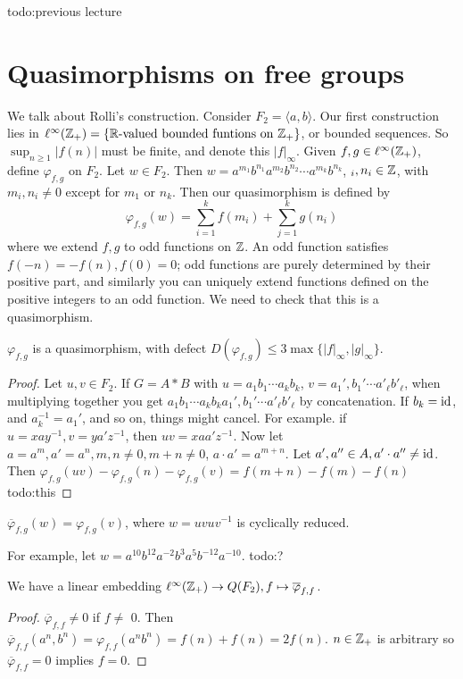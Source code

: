 {\color{red}todo:previous lecture} 
\section{Quasimorphisms on free groups} 
We talk about Rolli's construction. Consider $F_2=\langle a,b \rangle $. Our first construction lies in $\ell ^{\infty}(\Z_+)= \{\R\text{-valued bounded funtions on} \ \Z_+\} $, or bounded sequences. So $\sup _{n\geq 1}|f(n)|$ must be finite, and denote this $|f|_{\infty}$. Given $f,g \in \ell ^{\infty}(\mathbb{Z}_+)$, define $\varphi  _{f,g}$ on $F_2$. Let $w \in F_2$. Then $w=a ^{m_1}b^{n_1}a ^{m_2}b^{n_2}\cdots a ^{m_k}b ^{n_k}$, $_i ,n_i  \in \mathbb{Z}$, with $m_i ,n _i  \neq 0$ except for $m_1$ or $n_k$. Then our quasimorphism is defined by \[ \varphi _{f,g}(w)=\sum _{i=1}^k f(m_i )+ \sum _{j=1}^k g(n_i )
\] where we extend $f,g$ to odd functions on $\mathbb{Z}$. An odd function satisfies $f(-n)=-f(n), f(0)=0$; odd functions are purely determined by their positive part, and similarly you can uniquely extend functions defined on the positive integers to an odd function. We need to check that this is a quasimorphism.
\begin{lemma}
    $\varphi _{f,g}$ is a quasimorphism, with defect $D(\varphi _{f,g}) \leq 3 \max \{|f|_{\infty}, |g|_{\infty}\} $.
\end{lemma}
\begin{proof}
    Let $u,v \in F_2$. If $G=A*B$ with $u=a_1b_1 \cdots a_kb_k$, $v=a_1',b_1' \cdots a'_{\ell}b'_{\ell}$, when multiplying together you get $a_1b_1 \cdots a_kb_ka_1',b_1' \cdots a'_{\ell}b'_{\ell}$ by concatenation. If $b_k=\operatorname{id}$, and  $a_k^{-1}=a_1'$, and so on, things might cancel. For example. if $u=xay^{-1},v=ya'z^{-1}$, then $uv=xaa'z^{-1}$. Now let $a=a^m, a'=a^n ,  m,n\neq 0, m+n\neq 0$, $a\cdot a'=a ^{m+n}$. Let $a',a'' \in A, a' \cdot a''\neq \operatorname{id}$. Then $\varphi _{f,g}(uv)-\varphi _{f,g}(n)-\varphi _{f,g}(v)= f(m+n)-f(m)-f(n)$ {\color{red}todo:this} 
\end{proof}
\begin{lemma}
    $\overline{\varphi }_{f,g}(w)=\varphi _{f,g}(v)$, where $w=u v uv^{-1}$ is cyclically reduced.
\end{lemma}
For example, let $w=a^{10}b^{12}a^{-2}b^3a^{5}b^{-12}a^{-10}$. {\color{red}todo:?} 
\begin{lemma}
    We have a linear embedding $\ell ^{\infty}(\mathbb{Z}_+) \to Q(F_2), f\mapsto  \overline{\varphi }_{f,f}$.
\end{lemma}
\begin{proof}
    $\overline{\varphi }_{f,f}\neq 0$ if $f \neq $ 0. Then $\overline{\varphi }_{f,f}(a^n ,b^n )=\varphi _{f,f}(a^n b^n )=f(n)+f(n) = 2f(n)$. $n \in \mathbb{Z}_+$ is arbitrary so $\overline{\varphi }_{f,f}=0$ implies $f=0$.
\end{proof}
